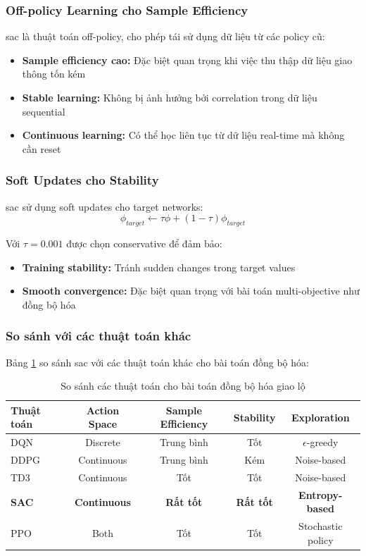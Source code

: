 \subsubsection{Off-policy Learning cho Sample Efficiency}
\ac{sac} là thuật toán off-policy, cho phép tái sử dụng dữ liệu từ các policy cũ:
\begin{itemize}
    \item \textbf{Sample efficiency cao:} Đặc biệt quan trọng khi việc thu thập dữ liệu giao thông tốn kém
    \item \textbf{Stable learning:} Không bị ảnh hưởng bởi correlation trong dữ liệu sequential
    \item \textbf{Continuous learning:} Có thể học liên tục từ dữ liệu real-time mà không cần reset
\end{itemize}

\subsubsection{Soft Updates cho Stability}
\ac{sac} sử dụng soft updates cho target networks:
\begin{equation}
    \phi_{target} \leftarrow \tau \phi + (1-\tau) \phi_{target}
\end{equation}

Với $\tau = 0.001$ được chọn conservative để đảm bảo:
\begin{itemize}
    \item \textbf{Training stability:} Tránh sudden changes trong target values
    \item \textbf{Smooth convergence:} Đặc biệt quan trọng với bài toán multi-objective như đồng bộ hóa
\end{itemize}

\subsubsection{So sánh với các thuật toán khác}
Bảng \ref{tab:algorithm_comparison} so sánh \ac{sac} với các thuật toán khác cho bài toán đồng bộ hóa:

\begin{table}[!htp]
\centering
\caption{So sánh các thuật toán cho bài toán đồng bộ hóa giao lộ}
\label{tab:algorithm_comparison}
\begin{tabular}{|l|c|c|c|c|}
\hline
\textbf{Thuật toán} & \textbf{Action Space} & \textbf{Sample Efficiency} & \textbf{Stability} & \textbf{Exploration} \\
\hline
DQN & Discrete & Trung bình & Tốt & $\epsilon$-greedy \\
\hline
DDPG & Continuous & Trung bình & Kém & Noise-based \\
\hline
TD3 & Continuous & Tốt & Tốt & Noise-based \\
\hline
\textbf{SAC} & \textbf{Continuous} & \textbf{Rất tốt} & \textbf{Rất tốt} & \textbf{Entropy-based} \\
\hline
PPO & Both & Tốt & Tốt & Stochastic policy \\
\hline
\end{tabular}
\end{table}


